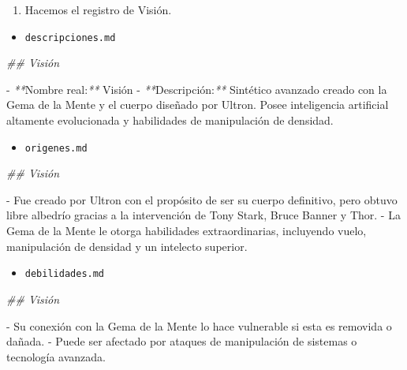 \documentclass[
]{book}
\newenvironment{Shaded}{\begin{snugshade}}{\end{snugshade}}
\newcommand{\CommentTok}[1]{\textcolor[rgb]{0.56,0.35,0.01}{\textit{#1}}}
\newcommand{\ExtensionTok}[1]{#1}
\newcommand{\NormalTok}[1]{#1}
\newcommand{\PreprocessorTok}[1]{\textcolor[rgb]{0.56,0.35,0.01}{\textit{#1}}}
\providecommand{\tightlist}{%
  \setlength{\itemsep}{0pt}\setlength{\parskip}{0pt}}
\begin{document}
\begin{enumerate}
\def\labelenumi{\arabic{enumi}.}
\setcounter{enumi}{1}
\tightlist
\item
  Hacemos el registro de Visión.
\end{enumerate}

\begin{itemize}
\tightlist
\item
  \texttt{descripciones.md}
\end{itemize}

\begin{Shaded}
\begin{Highlighting}[]
\CommentTok{\#\# Visión}

\ExtensionTok{{-}} \PreprocessorTok{**}\NormalTok{Nombre real:}\PreprocessorTok{**}\NormalTok{ Visión}
\ExtensionTok{{-}} \PreprocessorTok{**}\NormalTok{Descripción:}\PreprocessorTok{**}\NormalTok{ Sintético avanzado creado con la Gema de la Mente y el cuerpo diseñado por Ultron. Posee inteligencia artificial altamente evolucionada y habilidades de manipulación de densidad.}
\end{Highlighting}
\end{Shaded}

\begin{itemize}
\tightlist
\item
  \texttt{origenes.md}
\end{itemize}

\begin{Shaded}
\begin{Highlighting}[]
\CommentTok{\#\# Visión}

\ExtensionTok{{-}}\NormalTok{ Fue creado por Ultron con el propósito de ser su cuerpo definitivo, pero obtuvo libre albedrío gracias a la intervención de Tony Stark, Bruce Banner y Thor.}
\ExtensionTok{{-}}\NormalTok{ La Gema de la Mente le otorga habilidades extraordinarias, incluyendo vuelo, manipulación de densidad y un intelecto superior.}
\end{Highlighting}
\end{Shaded}

\begin{itemize}
\tightlist
\item
  \texttt{debilidades.md}
\end{itemize}

\begin{Shaded}
\begin{Highlighting}[]
\CommentTok{\#\# Visión}

\ExtensionTok{{-}}\NormalTok{ Su conexión con la Gema de la Mente lo hace vulnerable si esta es removida o dañada.}
\ExtensionTok{{-}}\NormalTok{ Puede ser afectado por ataques de manipulación de sistemas o tecnología avanzada.}
\end{Highlighting}
\end{Shaded}
\end{document}
